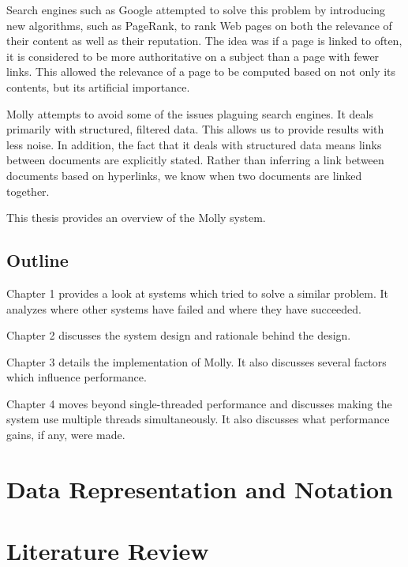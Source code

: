 \documentclass[12pt,letterpaper,oneside,draft]{report}
\theoremstyle{definition}
\begin{document}
			Search engines such as Google attempted to solve this problem by introducing new algorithms, such as PageRank, to rank Web pages on both the relevance of their content as well as their reputation.  The idea was if a page is linked to often, it is considered to be more authoritative on a subject than a page with fewer links.  This allowed the relevance of a page to be computed based on not only its contents, but its artificial importance.
		
			Molly attempts to avoid some of the issues plaguing search engines.  It deals primarily with structured, filtered data.  This allows us to provide results with less noise.  In addition, the fact that it deals with structured data means links between documents are explicitly stated.  Rather than inferring a link between documents based on hyperlinks, we know when two documents are linked together.
		
			This thesis provides an overview of the Molly system.
		
		\section*{Outline}
			Chapter 1 provides a look at systems which tried to solve a similar problem.  It analyzes where other systems have failed and where they have succeeded.
			
			Chapter 2 discusses the system design and rationale behind the design.
			
			Chapter 3 details the implementation of Molly.  It also discusses several factors which influence performance.
			
			Chapter 4 moves beyond single-threaded performance and discusses making the system use multiple threads simultaneously.  It also discusses what performance gains, if any, were made.

	\tableofcontents

	\listoftables
	\listoffigures
	\listofalgorithms

	\clearpage
	
	\setcounter{chapter}{-1}
	\chapter{Data Representation and Notation}

	\chapter{Literature Review}
\end{document}
